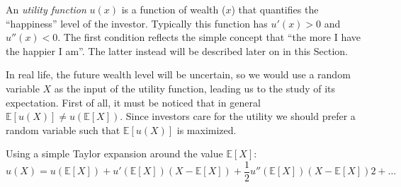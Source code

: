 %
%

%


An \emph{utility function} $u(x)$ is a function of wealth ($x$) that quantifies the ``happiness'' level of the investor. Typically this function has $u'(x) > 0$ and $u''(x) < 0$. The first condition reflects the simple concept that ``the more I have the happier I am''. The latter instead will be described later on in this Section.

In real life, the future wealth level will be uncertain, so we would use a random variable $X$ as the input of the utility function, leading us to the study of its expectation. First of all, it must be noticed that in general $\mathbb{E}[u(X)] \neq u(\mathbb{E}[X])$.
Since investors care for the utility we should prefer a random variable such that $\mathbb{E}[u(X)]$ is maximized.

Using a simple Taylor expansion around the value $\mathbb{E}[X]$:
\begin{equation*}
u(X) = u (\mathbb{E}[X]) + u'(\mathbb{E}[X]) (X − \mathbb{E}[X]) + \frac{1}{2}u''(\mathbb{E}[X]) (X − \mathbb{E}[X])2 + \ldots
\end{equation*}

